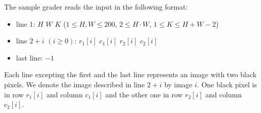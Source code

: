 The sample grader reads the input in the following format:
\begin{itemize}
\item line 1: $H$ $W$ $K$ ($1 \leq H, W \leq 200$, $2 \leq H \cdot W$, $1 \leq K \leq H+W-2$)
\item line $2+i$ $(i \geq 0)$: $r_1[i]$ $c_1[i]$ $r_2[i]$ $c_2[i]$
\item last line: $-1$
\end{itemize}

Each line excepting the first and the last line represents an image with two black pixels.
We denote the image described in line $2+i$ by image $i$.
One black pixel is in row $r_1[i]$ and column $c_1[i]$ and the other one in row $r_2[i]$ and column $c_2[i]$.

